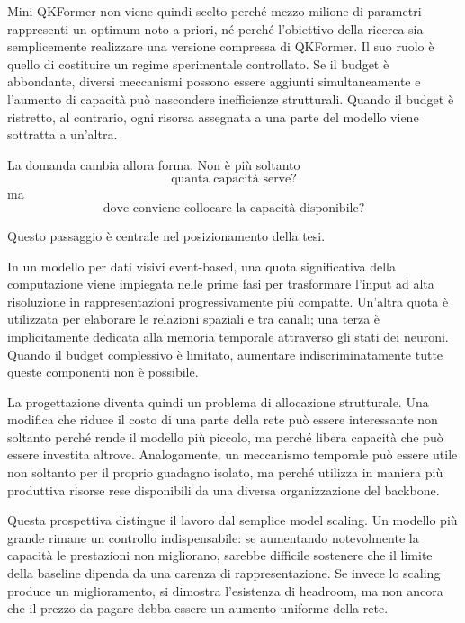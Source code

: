 Mini-QKFormer non viene quindi scelto perché mezzo milione di parametri rappresenti un optimum noto a priori, né perché l'obiettivo della ricerca sia semplicemente realizzare una versione compressa di QKFormer. Il suo ruolo è quello di costituire un regime sperimentale controllato. Se il budget è abbondante, diversi meccanismi possono essere aggiunti simultaneamente e l'aumento di capacità può nascondere inefficienze strutturali. Quando il budget è ristretto, al contrario, ogni risorsa assegnata a una parte del modello viene sottratta a un'altra.

La domanda cambia allora forma. Non è più soltanto
\begin{equation*}
\text{quanta capacità serve?}
\end{equation*}
ma
\begin{equation}
\label{eq:dove_allocare}
\boxed{\text{dove conviene collocare la capacità disponibile?}}
\end{equation}

Questo passaggio è centrale nel posizionamento della tesi.

In un modello per dati visivi event-based, una quota significativa della computazione viene impiegata nelle prime fasi per trasformare l'input ad alta risoluzione in rappresentazioni progressivamente più compatte. Un'altra quota è utilizzata per elaborare le relazioni spaziali e tra canali; una terza è implicitamente dedicata alla memoria temporale attraverso gli stati dei neuroni. Quando il budget complessivo è limitato, aumentare indiscriminatamente tutte queste componenti non è possibile.

La progettazione diventa quindi un problema di allocazione strutturale. Una modifica che riduce il costo di una parte della rete può essere interessante non soltanto perché rende il modello più piccolo, ma perché libera capacità che può essere investita altrove. Analogamente, un meccanismo temporale può essere utile non soltanto per il proprio guadagno isolato, ma perché utilizza in maniera più produttiva risorse rese disponibili da una diversa organizzazione del backbone.

Questa prospettiva distingue il lavoro dal semplice model scaling. Un modello più grande rimane un controllo indispensabile: se aumentando notevolmente la capacità le prestazioni non migliorano, sarebbe difficile sostenere che il limite della baseline dipenda da una carenza di rappresentazione. Se invece lo scaling produce un miglioramento, si dimostra l'esistenza di headroom, ma non ancora che il prezzo da pagare debba essere un aumento uniforme della rete.


